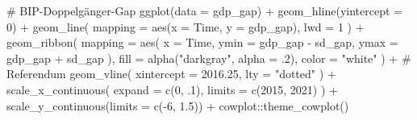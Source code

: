 \documentclass[
  a4paper,
  DIV=11,
  oneside]{scrreprt}
\newenvironment{Shaded}{\begin{snugshade}}{\end{snugshade}}
\newcommand{\AttributeTok}[1]{\textcolor[rgb]{0.40,0.45,0.13}{#1}}
\newcommand{\CommentTok}[1]{\textcolor[rgb]{0.37,0.37,0.37}{#1}}
\newcommand{\DecValTok}[1]{\textcolor[rgb]{0.68,0.00,0.00}{#1}}
\newcommand{\FloatTok}[1]{\textcolor[rgb]{0.68,0.00,0.00}{#1}}
\newcommand{\FunctionTok}[1]{\textcolor[rgb]{0.28,0.35,0.67}{#1}}
\newcommand{\NormalTok}[1]{\textcolor[rgb]{0.00,0.23,0.31}{#1}}
\newcommand{\SpecialCharTok}[1]{\textcolor[rgb]{0.37,0.37,0.37}{#1}}
\newcommand{\StringTok}[1]{\textcolor[rgb]{0.13,0.47,0.30}{#1}}
\begin{document}
\begin{Shaded}
\begin{Highlighting}[]
\CommentTok{\# BIP{-}Doppelgänger{-}Gap}
\FunctionTok{ggplot}\NormalTok{(}\AttributeTok{data =}\NormalTok{ gdp\_gap) }\SpecialCharTok{+}
  \FunctionTok{geom\_hline}\NormalTok{(}\AttributeTok{yintercept =} \DecValTok{0}\NormalTok{) }\SpecialCharTok{+}
  \FunctionTok{geom\_line}\NormalTok{(}
    \AttributeTok{mapping =} \FunctionTok{aes}\NormalTok{(}\AttributeTok{x =}\NormalTok{ Time, }\AttributeTok{y =}\NormalTok{ gdp\_gap),}
    \AttributeTok{lwd =} \DecValTok{1}
\NormalTok{  ) }\SpecialCharTok{+} 
  \FunctionTok{geom\_ribbon}\NormalTok{(}
    \AttributeTok{mapping =} \FunctionTok{aes}\NormalTok{(}
      \AttributeTok{x =}\NormalTok{ Time, }
      \AttributeTok{ymin =}\NormalTok{ gdp\_gap }\SpecialCharTok{{-}}\NormalTok{ sd\_gap, }
      \AttributeTok{ymax =}\NormalTok{ gdp\_gap }\SpecialCharTok{+}\NormalTok{ sd\_gap}
\NormalTok{    ), }
    \AttributeTok{fill =} \FunctionTok{alpha}\NormalTok{(}\StringTok{"darkgray"}\NormalTok{, }\AttributeTok{alpha =}\NormalTok{ .}\DecValTok{2}\NormalTok{), }
    \AttributeTok{color =} \StringTok{"white"}
\NormalTok{  ) }\SpecialCharTok{+}
  \CommentTok{\# Referendum}
  \FunctionTok{geom\_vline}\NormalTok{(}
    \AttributeTok{xintercept =} \FloatTok{2016.25}\NormalTok{,}
    \AttributeTok{lty =} \StringTok{"dotted"}
\NormalTok{  ) }\SpecialCharTok{+}
  \FunctionTok{scale\_x\_continuous}\NormalTok{(}
    \AttributeTok{expand =} \FunctionTok{c}\NormalTok{(}\DecValTok{0}\NormalTok{, .}\DecValTok{1}\NormalTok{), }
    \AttributeTok{limits =} \FunctionTok{c}\NormalTok{(}\DecValTok{2015}\NormalTok{, }\DecValTok{2021}\NormalTok{)}
\NormalTok{  ) }\SpecialCharTok{+}
  \FunctionTok{scale\_y\_continuous}\NormalTok{(}\AttributeTok{limits =} \FunctionTok{c}\NormalTok{(}\SpecialCharTok{{-}}\DecValTok{6}\NormalTok{, }\FloatTok{1.5}\NormalTok{)) }\SpecialCharTok{+}
\NormalTok{  cowplot}\SpecialCharTok{::}\FunctionTok{theme\_cowplot}\NormalTok{()}
\end{Highlighting}
\end{Shaded}
\end{document}
